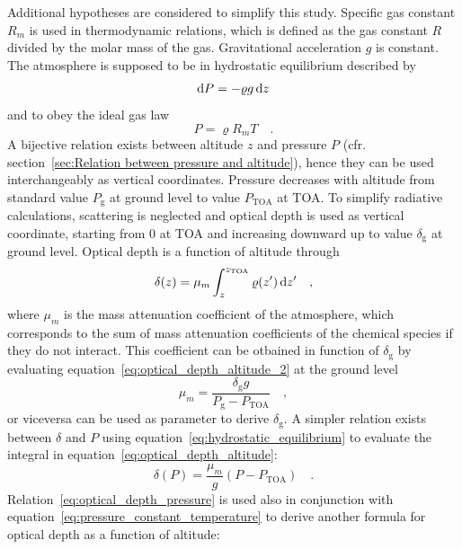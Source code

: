 \documentclass[a4paper,10pt,twocolumn,\classoptions]{article}
\newcommand{\zTOA}{z_\text{TOA}}
\newcommand{\PTOA}{P_\text{TOA}}
\begin{document}
Additional hypotheses are considered to simplify this study.
Specific gas constant $R_m$ is used in thermodynamic relations, which is defined as the gas constant $R$ divided by the molar mass of the gas.
Gravitational acceleration $g$ is constant.
The atmosphere is supposed to be in hydrostatic equilibrium described by
\begin{equation}
  \label{eq:hydrostatic_equilibrium}
  \odif{P} = - \varrho g \odif{z}
\end{equation}
and to obey the ideal gas law
\begin{equation}
  \label{eq:ideal_gas_law}
  P = \varrho R_m T
  \quad .
\end{equation}
A bijective relation exists between altitude $z$ and pressure $P$ (cfr. section~\ref{sec:Relation between pressure and altitude}), hence they can be used interchangeably as vertical coordinates. Pressure decreases with altitude from standard value $P_\text{g}$ at ground level to value $\PTOA$ at TOA.
To simplify radiative calculations, scattering is neglected and optical depth is used as vertical coordinate, starting from \num{0} at TOA and increasing downward up to value $\delta_\text{g}$ at ground level. Optical depth is a function of altitude through
\begin{equation}
  \label{eq:optical_depth_altitude}
  \delta(z) = \mu_m \int_{z}^{\zTOA} \varrho(z') \odif{z'}
  \quad ,
\end{equation}
where $\mu_m$ is the mass attenuation coefficient of the atmosphere, which corresponds to the sum of mass attenuation coefficients of the chemical species if they do not interact. This coefficient can be otbained in function of $\delta_\text{g}$ by evaluating equation~\eqref{eq:optical_depth_altitude_2} at the ground level
\begin{equation}
  \label{eq:mass_attenuation_coefficient}
  \mu_m = \frac{\delta_\text{g} g}{P_\text{g} - \PTOA}
  \quad ,
\end{equation}
or viceversa can be used as parameter to derive $\delta_\text{g}$. A simpler relation exists between $\delta$ and $P$ using equation~\eqref{eq:hydrostatic_equilibrium} to evaluate the integral in equation~\eqref{eq:optical_depth_altitude}:
\begin{equation}
  \label{eq:optical_depth_pressure}
  \delta(P) = \frac{\mu_m}{g} (P - \PTOA)
  \quad .
\end{equation}
Relation~\eqref{eq:optical_depth_pressure} is used also in conjunction with equation~\eqref{eq:pressure_constant_temperature} to derive another formula for optical depth as a function of altitude:
\end{document}
